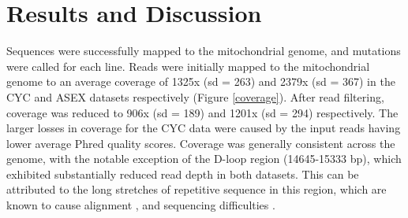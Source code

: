\documentclass[12pt,twoside]{reedthesis}
\begin{document}
\chapter*{Results and Discussion}
Sequences were successfully mapped to the mitochondrial genome, and mutations were called for each line. 
Reads were initially mapped to the mitochondrial genome to an average coverage of 1325x (sd = 263) and 2379x (sd = 367) in the \gls{CYC} and \gls{ASEX} datasets respectively (Figure \ref{coverage}).
After read filtering, coverage was reduced to 906x (sd = 189) and 1201x (sd = 294) respectively.
The larger losses in coverage for the \gls{CYC} data were caused by the input reads having lower average Phred quality scores.
Coverage was generally consistent across the genome, with the notable exception of the D-loop region (14645-15333 bp), which exhibited substantially reduced read depth in both datasets.
This can be attributed to the long stretches of repetitive sequence in this region, which are known to cause alignment \citep{ekblom_patterns_2014}, and sequencing difficulties \citep{jiang_missing_2015}.
\end{document}
